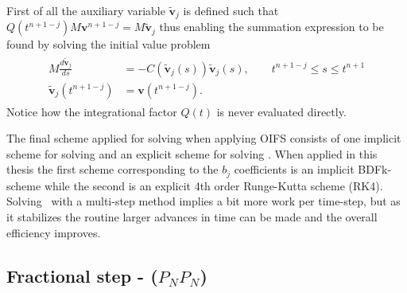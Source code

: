 First of all the auxiliary variable $\tilde{\mathbf{v}}_j$ is defined such that $Q(t^{n+1-j})M\mathbf{v}^{n+1-j} = M\tilde{\mathbf{v}}_j$
thus enabling the summation expression to be found by solving the initial value problem 
\begin{align}
    \begin{split}
    M\frac{d\tilde{\mathbf{v}}_j}{ds} &= -C(\tilde{\mathbf{v}}_j(s))\tilde{\mathbf{v}}_j(s) , \qquad t^{n+1-j}\leq s\leq t^{n+1}\\
    \tilde{\mathbf{v}}_j(t^{n+1-j}) &= \mathbf{v}(t^{n+1-j}).
    \end{split}
    \label{eq:IVP}
\end{align}
Notice how the integrational factor $Q(t)$ is never evaluated directly.

The final scheme applied for solving  when applying OIFS consists of one implicit scheme for 
solving  and an explicit scheme for solving . When applied in this thesis the 
first scheme corresponding to the $b_j$ coefficients is an implicit BDFk-scheme while the second is an explicit 4th order Runge-Kutta scheme (RK4). 
Solving~ with a multi-step method implies a bit more work per time-step, but as it stabilizes the routine larger advances in 
time can be made and the overall efficiency improves.


\subsection{Fractional step - ($P_NP_N$)} 
\label{fracstep}

